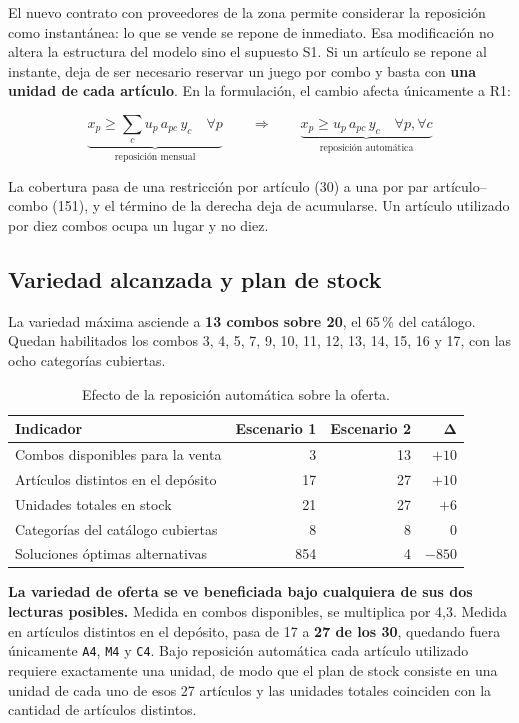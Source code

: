 \documentclass[10pt,a4paper]{article}
\newcommand{\art}[1]{\texttt{#1}}
\begin{document}
El nuevo contrato con proveedores de la zona permite considerar la reposición
como instantánea: lo que se vende se repone de inmediato. Esa modificación no
altera la estructura del modelo sino el supuesto S1. Si un artículo se repone al
instante, deja de ser necesario reservar un juego por combo y basta con
\textbf{una unidad de cada artículo}. En la formulación, el cambio afecta
únicamente a R1:

\[
\underbrace{x_p \geq \sum_c u_p\, a_{pc}\, y_c \quad \forall p}_{\text{reposición mensual}}
\qquad\Longrightarrow\qquad
\underbrace{x_p \geq u_p\, a_{pc}\, y_c \quad \forall p, \forall c}_{\text{reposición automática}}
\]

La cobertura pasa de una restricción por artículo (30) a una por par
artículo--combo (151), y el término de la derecha deja de acumularse. Un
artículo utilizado por diez combos ocupa un lugar y no diez.

\subsection{Variedad alcanzada y plan de stock}

La variedad máxima asciende a \textbf{13 combos sobre 20}, el 65\,\% del
catálogo. Quedan habilitados los combos 3, 4, 5, 7, 9, 10, 11, 12, 13, 14, 15,
16 y 17, con las ocho categorías cubiertas.

\begin{table}[H]
\centering\small
\caption{Efecto de la reposición automática sobre la oferta.}
\label{tab:comparacion_12}
\begin{tabular}{lrrr}
\toprule
\textbf{Indicador} & \textbf{Escenario 1} & \textbf{Escenario 2} & $\boldsymbol{\Delta}$ \\
\midrule
Combos disponibles para la venta   & 3  & 13 & $+10$ \\
Artículos distintos en el depósito & 17 & 27 & $+10$ \\
Unidades totales en stock          & 21 & 27 & $+6$ \\
Categorías del catálogo cubiertas  & 8  & 8  & 0 \\
Soluciones óptimas alternativas    & 854 & 4 & $-850$ \\
\bottomrule
\end{tabular}
\end{table}

\textbf{La variedad de oferta se ve beneficiada bajo cualquiera de sus dos
lecturas posibles.} Medida en combos disponibles, se multiplica por 4,3. Medida
en artículos distintos en el depósito, pasa de 17 a \textbf{27 de los 30},
quedando fuera únicamente \art{A4}, \art{M4} y \art{C4}. Bajo reposición
automática cada artículo utilizado requiere exactamente una unidad, de modo que
el plan de stock consiste en una unidad de cada uno de esos 27 artículos y las
unidades totales coinciden con la cantidad de artículos distintos.
\end{document}
